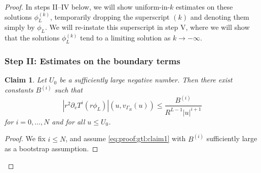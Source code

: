\documentclass[11pt,english]{article}
\numberwithin{equation}{section}
\theoremstyle{remark}
\theoremstyle{plain}
\newtheorem{claim}{Claim}
\theoremstyle{remark}
\newcommand{\pv}{\partial_v}
\renewcommand{\(}{\left(}
\renewcommand{\)}{\right)}
\begin{document}
\begin{proof}
In steps II--IV below, we will show uniform-in-$k$ estimates on these solutions $\phi_L^{(k)}$, temporarily dropping the superscript $(k)$ and denoting them simply by $\phi_L$. We will re-instate this superscript in step V, where we will show that the solutions $\phi_L^{(k)}$ tend to a limiting solution as $k\to-\infty$.


\subsubsection*{Step II: Estimates on the boundary terms}
	\begin{claim}\label{claim1}
	Let $U_0$ be a sufficiently large negative number.	Then there exist constants $B^{(i)}$ such that
	\begin{equation}
	\left|r^2\pv T^i(r\phi_L)\right|(u,v_{\Gamma_R}(u))\leq\frac{B^{(i)}}{R^{L-1}|u|^{i+1}}
		\label{eq:proof:gtl:claim1}
	\end{equation} for $i=0,\dots, N$ and for all $u\leq U_0$.
	\end{claim}
\begin{proof}
We fix $i\leq N$,  and assume \eqref{eq:proof:gtl:claim1} with $B^{(i)}$ sufficiently large as a bootstrap assumption. 


\end{proof}
\end{proof}
\end{document}
